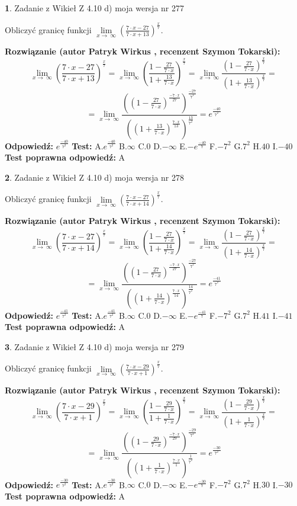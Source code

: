 \documentclass[12pt, a4paper]{article}
\theoremstyle{definition} %
\newtheorem{zad}{}
\newcommand{\zadStart}[1]{\begin{zad}#1\newline}
\newcommand{\zadStop}{\end{zad}}
\newcommand{\rozwStart}[2]{\noindent \textbf{Rozwiązanie (autor #1 , recenzent #2): }\newline}
\newcommand{\rozwStop}{\newline}
\newcommand{\odpStart}{\noindent \textbf{Odpowiedź:}\newline}
\newcommand{\odpStop}{\newline}
\newcommand{\testStart}{\noindent \textbf{Test:}\newline}
\newcommand{\testStop}{\newline}
\newcommand{\kluczStart}{\noindent \textbf{Test poprawna odpowiedź:}\newline}
\newcommand{\kluczStop}{\newline}
\begin{document}
\zadStart{Zadanie z Wikieł Z 4.10 d) moja wersja nr 277}


Obliczyć granicę funkcji  $\lim\limits_{x\to\ \infty}(\frac{7\cdot x-27}{7\cdot x+13})^{\frac{x}{7}}$.
\zadStop
\rozwStart{Patryk Wirkus}{Szymon Tokarski}
$$\lim\limits_{x\to\ \infty}(\frac{7\cdot x-27}{7\cdot x+13})^{\frac{x}{7}} = \lim\limits_{x\to\ \infty}(\frac{1-\frac{27}{7\cdot x}}{1+\frac{13}{7\cdot x}})^{\frac{x}{7}}=\lim\limits_{x\to\ \infty}\frac{(1-\frac{27}{7\cdot x})^{\frac{x}{7}}}{(1+\frac{13}{7\cdot x})^{\frac{x}{7}}}=$$
$$=\lim\limits_{x\to\ \infty}\frac{((1-\frac{27}{7\cdot x})^{\frac{-7\cdot x}{27}})^{\frac{-27}{7^{2}}}}{((1+\frac{13}{7\cdot x})^{\frac{7\cdot x}{13}})^{\frac{13}{7^{2}}}}=e^{\frac{-40}{7^{2}}}$$
\rozwStop
\odpStart
$e^{\frac{-40}{7^{2}}}$
\odpStop
\testStart
A.$e^{\frac{-40}{7^{2}}}$ B.$\infty$ C.$0$ D.$-\infty$ E.$-e^{\frac{-40}{7}}$
F.$-7^{2}$ G.$7^{2}$
H.$40$
I.$-40$
\testStop
\kluczStart
A
\kluczStop



\zadStart{Zadanie z Wikieł Z 4.10 d) moja wersja nr 278}


Obliczyć granicę funkcji  $\lim\limits_{x\to\ \infty}(\frac{7\cdot x-27}{7\cdot x+14})^{\frac{x}{7}}$.
\zadStop
\rozwStart{Patryk Wirkus}{Szymon Tokarski}
$$\lim\limits_{x\to\ \infty}(\frac{7\cdot x-27}{7\cdot x+14})^{\frac{x}{7}} = \lim\limits_{x\to\ \infty}(\frac{1-\frac{27}{7\cdot x}}{1+\frac{14}{7\cdot x}})^{\frac{x}{7}}=\lim\limits_{x\to\ \infty}\frac{(1-\frac{27}{7\cdot x})^{\frac{x}{7}}}{(1+\frac{14}{7\cdot x})^{\frac{x}{7}}}=$$
$$=\lim\limits_{x\to\ \infty}\frac{((1-\frac{27}{7\cdot x})^{\frac{-7\cdot x}{27}})^{\frac{-27}{7^{2}}}}{((1+\frac{14}{7\cdot x})^{\frac{7\cdot x}{14}})^{\frac{14}{7^{2}}}}=e^{\frac{-41}{7^{2}}}$$
\rozwStop
\odpStart
$e^{\frac{-41}{7^{2}}}$
\odpStop
\testStart
A.$e^{\frac{-41}{7^{2}}}$ B.$\infty$ C.$0$ D.$-\infty$ E.$-e^{\frac{-41}{7}}$
F.$-7^{2}$ G.$7^{2}$
H.$41$
I.$-41$
\testStop
\kluczStart
A
\kluczStop



\zadStart{Zadanie z Wikieł Z 4.10 d) moja wersja nr 279}


Obliczyć granicę funkcji  $\lim\limits_{x\to\ \infty}(\frac{7\cdot x-29}{7\cdot x+1})^{\frac{x}{7}}$.
\zadStop
\rozwStart{Patryk Wirkus}{Szymon Tokarski}
$$\lim\limits_{x\to\ \infty}(\frac{7\cdot x-29}{7\cdot x+1})^{\frac{x}{7}} = \lim\limits_{x\to\ \infty}(\frac{1-\frac{29}{7\cdot x}}{1+\frac{1}{7\cdot x}})^{\frac{x}{7}}=\lim\limits_{x\to\ \infty}\frac{(1-\frac{29}{7\cdot x})^{\frac{x}{7}}}{(1+\frac{1}{7\cdot x})^{\frac{x}{7}}}=$$
$$=\lim\limits_{x\to\ \infty}\frac{((1-\frac{29}{7\cdot x})^{\frac{-7\cdot x}{29}})^{\frac{-29}{7^{2}}}}{((1+\frac{1}{7\cdot x})^{\frac{7\cdot x}{1}})^{\frac{1}{7^{2}}}}=e^{\frac{-30}{7^{2}}}$$
\rozwStop
\odpStart
$e^{\frac{-30}{7^{2}}}$
\odpStop
\testStart
A.$e^{\frac{-30}{7^{2}}}$ B.$\infty$ C.$0$ D.$-\infty$ E.$-e^{\frac{-30}{7}}$
F.$-7^{2}$ G.$7^{2}$
H.$30$
I.$-30$
\testStop
\kluczStart
A
\kluczStop
\end{document}
